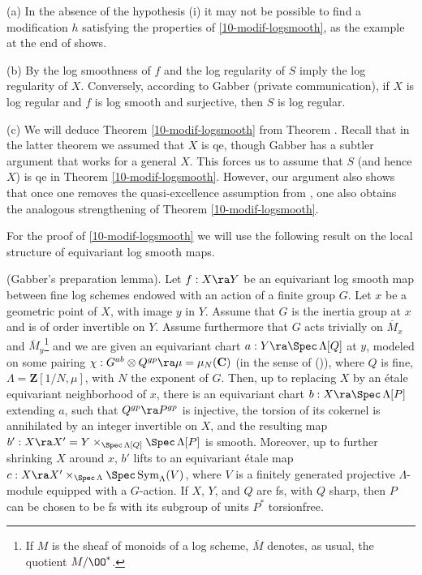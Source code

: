 \documentclass[10pt]{../fichiers-configuration-latex/smfart}
\begin{document}
\begin{remark2}\label{10-remark main th.} (a) In the absence
of the hypothesis (i) it may not be possible to find a modification $h$
satisfying the properties of \ref{10-modif-logsmooth}, as the example at
the end of  shows.

(b) By \cite[8.2]{Toric@Kato} the log smoothness of $f$ and the log regularity
of $S$ imply the log regularity of $X$. Conversely, according to Gabber
(private communication), if $X$ is log regular and $f$ is log smooth and
surjective, then $S$ is log regular.

(c) We will deduce Theorem \ref{10-modif-logsmooth} from Theorem 
. Recall that in the latter theorem we assumed
that $X$ is qe, though Gabber has a subtler argument that works for a general $X$. 
This forces us to assume that $S$ (and hence $X$) is qe in Theorem 
\ref{10-modif-logsmooth}. However, our argument also shows that
once one removes the quasi-excellence assumption from ,
one also obtains the analogous strengthening of Theorem \ref{10-modif-logsmooth}.
\end{remark2}

\medskip For the proof of \ref{10-modif-logsmooth} we will use the following
result on the local structure of equivariant log smooth maps.

\begin{proposition}\label{10-local-structure} (Gabber's preparation
lemma). Let $f : X \ra Y$ be an equivariant log smooth map between fine
log schemes endowed with an action of a finite group $G$. Let $x$ be a
geometric point of $X$, with image $y$ in $Y$. Assume that $G$ is the inertia
group at $x$ and is of order invertible on $Y$. Assume furthermore that $G$
acts trivially on $\overline{M}_{x}$ and $\overline{M}_{y}$\footnote{If $M$
is the sheaf of monoids of a log scheme, $\overline{M}$ denotes, as usual,
the quotient $M/\OO^*$.} and we are given an equivariant chart $a
: Y \ra \Spec \,\Lambda[Q]$ at $y$, modeled on some pairing $\chi : G^{ab}
\otimes Q^{gp} \ra \mu = \mu_N(\mathbf{C})$ (in the sense of ()),
where $Q$ is fine, $\Lambda = \mathbf{Z}[1/N, \mu]$, with $N$ the exponent of
$G$. Then, up to replacing $X$ by an étale equivariant neighborhood of $x$,
there is an equivariant chart $b : X \ra \Spec \,\Lambda[P]$ extending $a$,
such that $Q^{gp} \ra P^{gp}$ is injective, the torsion of its cokernel is
annihilated by an integer invertible on $X$, and the resulting map $b' :
X \ra X' = Y \times_{\Spec \,\Lambda[Q]}\Spec \,\Lambda[P]$ is smooth. Moreover,
up to further shrinking $X$ around $x$, $b'$ lifts to an equivariant étale
map $c : X \ra X' \times_{\Spec \,\Lambda} \Spec \, \mathrm{Sym}_{\Lambda}(V)$,
where $V$ is a finitely generated projective $\Lambda$-module equipped with a
$G$-action. If $X$, $Y$, and $Q$ are fs, with $Q$ sharp, then $P$ can be chosen
to be fs with its subgroup of units $P^*$ torsionfree.
\end{proposition}
\end{document}
